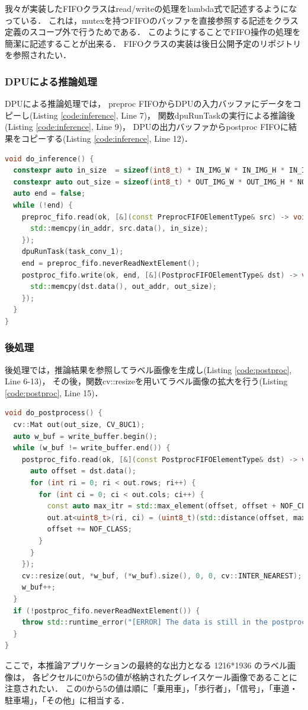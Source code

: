 我々が実装したFIFOクラスはread/writeの処理をlambda式で記述するようになっている．
これは，mutexを持つFIFOのバッファを直接参照する記述をクラス定義のスコープ外で行うためである．
このようにすることでFIFO操作の処理を簡潔に記述することが出来る．
FIFOクラスの実装は後日公開予定のリポジトリを参照されたい．

\subsubsection{DPUによる推論処理}
DPUによる推論処理では，
preproc FIFOからDPUの入力バッファにデータをコピーし(Listing \ref{code:inference}, Line 7)，
関数dpuRunTaskの実行による推論後(Listing \ref{code:inference}, Line 9)，
DPUの出力バッファからpostproc FIFOに結果をコピーする(Listing \ref{code:inference}, Line 12)．

\setcounter{lstnumber}{1}
\begin{lstlisting}[language=c++,firstnumber=last,caption=do\_inference(),label=code:inference]
void do_inference() {
  constexpr auto in_size  = sizeof(int8_t) * IN_IMG_W * IN_IMG_H * IN_IMG_C;
  constexpr auto out_size = sizeof(int8_t) * OUT_IMG_W * OUT_IMG_H * NOF_CLASS;
  auto end = false;
  while (!end) {
    preproc_fifo.read(ok, [&](const PreprocFIFOElementType& src) -> void {
      std::memcpy(in_addr, src.data(), in_size);
    });
    dpuRunTask(task_conv_1);
    end = preproc_fifo.neverReadNextElement();
    postproc_fifo.write(ok, end, [&](PostprocFIFOElementType& dst) -> void {
      std::memcpy(dst.data(), out_addr, out_size);
    });
  }
}
\end{lstlisting}

\subsubsection{後処理}
後処理では，推論結果を参照してラベル画像を生成し(Listing \ref{code:postproc}, Line 6-13)，
その後，関数cv::resizeを用いてラベル画像の拡大を行う(Listing \ref{code:postproc}, Line 15)．

\setcounter{lstnumber}{1}
\begin{lstlisting}[language=c++,firstnumber=last,caption=do\_postprocess(),label=code:postproc]
void do_postprocess() {
  cv::Mat out(out_size, CV_8UC1);
  auto w_buf = write_buffer.begin();
  while (w_buf != write_buffer.end()) {
    postproc_fifo.read(ok, [&](const PostprocFIFOElementType& dst) -> void {
      auto offset = dst.data();
      for (int ri = 0; ri < out.rows; ri++) {
        for (int ci = 0; ci < out.cols; ci++) {
          const auto max_itr = std::max_element(offset, offset + NOF_CLASS);
          out.at<uint8_t>(ri, ci) = (uint8_t)(std::distance(offset, max_itr));
          offset += NOF_CLASS;
        }
      }
    });
    cv::resize(out, *w_buf, (*w_buf).size(), 0, 0, cv::INTER_NEAREST);
    w_buf++;
  }
  if (!postproc_fifo.neverReadNextElement()) {
    throw std::runtime_error("[ERROR] The data is still in the postproc FIFO.");
  }
}
\end{lstlisting}

ここで，本推論アプリケーションの最終的な出力となる 1216*1936 のラベル画像は，
各ピクセルに0から5の値が格納されたグレイスケール画像であることに注意されたい．
この0から5の値は順に「乗用車」，「歩行者」，「信号」，「車道・駐車場」，「その他」に相当する．
